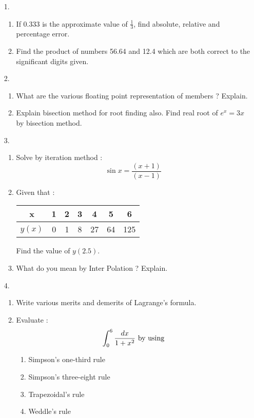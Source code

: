 \documentclass[12pt]{article}
\begin{document}
\begin{enumerate}

	\item[1.]
	\begin{enumerate}
		\item If 0.333 is the approximate value of $\frac{1}{3}$, find absolute, relative and percentage error.
		\item Find the product of numbers 56.64 and 12.4 which are both correct to the significant digits given.
	\end{enumerate}

	\item[2.]
	\begin{enumerate}
		\item What are the various floating point representation of members ? Explain.
		\item Explain bisection method for root finding also. Find real root of $e^x = 3x$ by bisection method.
	\end{enumerate}

	\item[3.]
	\begin{enumerate}
		\item Solve by iteration method :
			\begin{equation*}
				\sin x = \frac{(x+1)}{(x-1)}
			\end{equation*}
		\item Given that :
			\begin{center}
				\begin{tabular}{|c|c|c|c|c|c|c|}
					\hline
					x      & 1 & 2 & 3 & 4  & 5  & 6   \\
					\hline
					$y(x)$ & 0 & 1 & 8 & 27 & 64 & 125 \\
					\hline
				\end{tabular}
			\end{center}
			Find the value of $y(2.5).$
		\item What do you mean by Inter Polation ? Explain.
	\end{enumerate}

	\item[4.]
	\begin{enumerate}
		\item Write various merits and demerits of Lagrange's formula.
		\item Evaluate :
			\begin{equation*}
				\int_0^6\frac{dx}{1+x^2}\ \textnormal{by using}
			\end{equation*}
			\begin{enumerate}
				\item Simpson's one-third rule
				\item Simpson's three-eight rule
				\item Trapezoidal's rule
				\item Weddle's rule
			\end{enumerate}
	\end{enumerate}


\end{enumerate}
\end{document}
